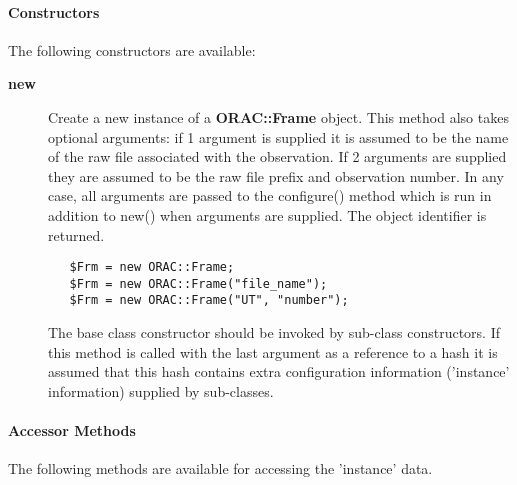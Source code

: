 \paragraph*{Constructors\label{ORAC::Frame_Constructors}}

The following constructors are available:

\begin{description}
\item[\textbf{new}] \mbox{}

Create a new instance of a \textbf{ORAC::Frame} object.  This method also
takes optional arguments: if 1 argument is supplied it is assumed to
be the name of the raw file associated with the observation. If 2
arguments are supplied they are assumed to be the raw file prefix and
observation number. In any case, all arguments are passed to the
configure() method which is run in addition to new() when arguments
are supplied.  The object identifier is returned.

\begin{verbatim}
   $Frm = new ORAC::Frame;
   $Frm = new ORAC::Frame("file_name");
   $Frm = new ORAC::Frame("UT", "number");
\end{verbatim}


The base class constructor should be invoked by sub-class constructors.
If this method is called with the last argument as a reference to
a hash it is assumed that this hash contains extra configuration
information ('instance' information) supplied by sub-classes.

\end{description}
\paragraph*{Accessor Methods\label{ORAC::Frame_Accessor_Methods}}

The following methods are available for accessing the 
'instance' data.

